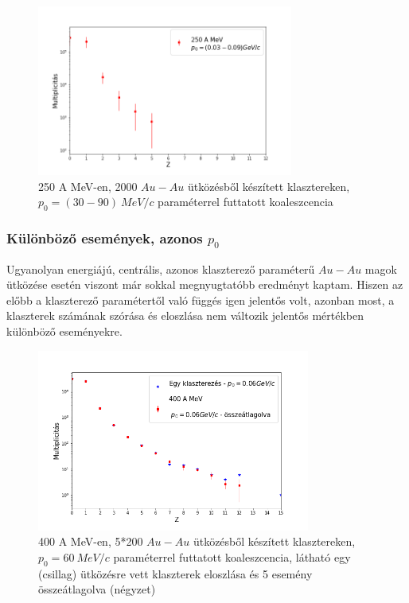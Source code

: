 \documentclass[a4paper,12pt]{article}
\begin{document}
\vspace{5mm}

\begin{figure}[!htb]
\centering
\includegraphics[width=0.75\textwidth]{./p0valtozik_klaszterek.png}
\caption{250 A MeV-en, 2000 $Au-Au$ ütközésből készített klasztereken, $p_{0} = (30 - 90) ~MeV/c$ paraméterrel futtatott koaleszcencia}
\end{figure}

\vspace{5mm}

\subsubsection{ Különböző események, azonos $p_{0}$}

\vspace{5mm}

\par Ugyanolyan energiájú, centrális, azonos klaszterező paraméterű $Au-Au$ magok ütközése esetén viszont már sokkal megnyugtatóbb eredményt kaptam. Hiszen az előbb a klaszterező paramétertől való függés igen jelentős volt, azonban most, a klaszterek számának szórása és eloszlása nem változik jelentős mértékben különböző eseményekre. 

\vspace{5mm}

\begin{figure}[!htb]
\centering
\includegraphics[width=0.8\textwidth]{./p0allando_kulonbozoRandom.png}
\caption{400 A MeV-en, 5*200 $Au-Au$ ütközésből készített klasztereken, $p_{0} = 60 ~MeV/c$ paraméterrel futtatott koaleszcencia, látható egy (csillag) ütközésre vett klaszterek eloszlása és 5 esemény összeátlagolva (négyzet)}
\end{figure}
\end{document}
